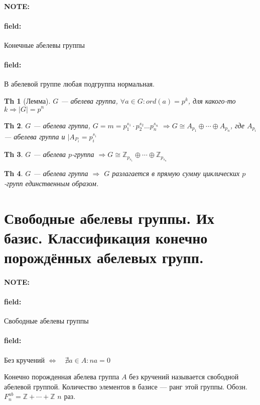 \documentclass[12pt]{article}
\newenvironment{note}{\paragraph{NOTE:}}{}
\newenvironment{field}{\paragraph{field:}}{}
\newtheorem{theorem}{Th}
\begin{document}
\begin{note}
  \begin{field}
    Конечные абелевы группы
  \end{field}
  \begin{field}
    В абелевой группе любая подгруппа нормальная.

    \begin{theorem}[Лемма]
      $G$ --- абелева группа, $\forall a \in G: ord(a) = p^{k}$, для какого-то
      $k \Rightarrow |G| = p^{n}$
    \end{theorem}

    \begin{theorem}
      $G$ --- абелева группа,
      $G = m = p_{1}^{s_{1}} \cdot p_{2}^{s_{2}} \ldots p_{n}^{s_{n}}$
      $\Rightarrow G \cong A_{p_{1}} \oplus \cdots \oplus A_{p_{n}}$, где
      $A_{p_{i}}$ --- абелева группа и $|A_{P_{i}} = p_{i}^{s_{i}}$
    \end{theorem}

    \begin{theorem}
      $G$ --- абелева $p$-группа
      $\Rightarrow G \cong \mathbb{Z}_{p_{s_{1}}} \oplus \cdots \oplus \mathbb{Z}_{p_{s_{n}}}$
    \end{theorem}

    \begin{theorem}
      $G$ --- абелева группа $\Rightarrow$ $G$ разлагается в прямую сумму
      циклических $p$-групп единственным образом.
    \end{theorem}
  \end{field}
\end{note}

\section{Свободные абелевы группы. Их базис. Классификация конечно порождённых
абелевых групп.}

\begin{note}
  \begin{field}
    Свободные абелевы группы
  \end{field}
  \begin{field}
    Без кручений $\Leftrightarrow \quad{} \nexists a \in A: na = 0$

    Конечно порожденная абелева группа $A$ без кручений называется свободной
    абелевой группой. Количество элементов в базисе --- ранг этой группы.
    Обозн. $F_{n}^{ab} = \mathbb{Z} + \cdots + \mathbb{Z}$ $n$ раз.
  \end{field}
\end{note}
\end{document}
